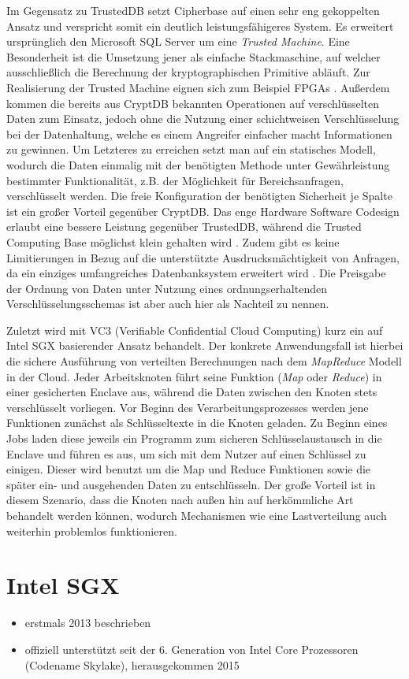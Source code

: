 Im Gegensatz zu TrustedDB setzt Cipherbase \cite{Arasu2012}\cite{Arasu} auf einen sehr eng gekoppelten Ansatz und verspricht somit ein deutlich leistungsfähigeres System. Es erweitert ursprünglich den Microsoft SQL Server um eine \textit{Trusted Machine}. Eine Besonderheit ist die Umsetzung jener als einfache Stackmaschine, auf welcher ausschließlich die Berechnung der kryptographischen Primitive abläuft. Zur Realisierung der Trusted Machine eignen sich zum Beispiel FPGAs \cite{Arasu}. Außerdem kommen die bereits aus CryptDB bekannten Operationen auf verschlüsselten Daten zum Einsatz, jedoch ohne die Nutzung einer schichtweisen Verschlüsselung bei der Datenhaltung, welche es einem Angreifer einfacher macht Informationen zu gewinnen. Um Letzteres zu erreichen setzt man auf ein statisches Modell, wodurch die Daten einmalig mit der benötigten Methode unter Gewährleistung bestimmter Funktionalität, z.B. der Möglichkeit für Bereichsanfragen, verschlüsselt werden. Die freie Konfiguration der benötigten Sicherheit je Spalte ist ein großer Vorteil gegenüber CryptDB. Das enge Hardware Software Codesign erlaubt eine bessere Leistung gegenüber TrustedDB, während die Trusted Computing Base möglichst klein gehalten wird \cite{Arasu}. Zudem gibt es keine Limitierungen in Bezug auf die unterstützte Ausdrucksmächtigkeit von Anfragen, da ein einziges umfangreiches Datenbanksystem erweitert wird \cite{Arasu2013}. Die Preisgabe der Ordnung von Daten unter Nutzung eines ordnungserhaltenden Verschlüsselungsschemas ist aber auch hier als Nachteil zu nennen.

Zuletzt wird mit VC3 (Verifiable Confidential Cloud Computing) \cite{Schuster2015} kurz ein auf Intel SGX basierender Ansatz behandelt. Der konkrete Anwendungsfall ist hierbei die sichere Ausführung von verteilten Berechnungen nach dem \textit{MapReduce} Modell in der Cloud. Jeder Arbeitsknoten führt seine Funktion (\textit{Map} oder \textit{Reduce}) in einer gesicherten Enclave aus, während die Daten zwischen den Knoten stets verschlüsselt vorliegen. Vor Beginn des Verarbeitungsprozesses werden jene Funktionen zunächst als Schlüsseltexte in die Knoten geladen. Zu Beginn eines Jobs laden diese jeweils ein Programm zum sicheren Schlüsselaustausch in die Enclave und führen es aus, um sich mit dem Nutzer auf einen Schlüssel zu einigen. Dieser wird benutzt um die Map und Reduce Funktionen sowie die später ein- und ausgehenden Daten zu entschlüsseln. Der große Vorteil ist in diesem Szenario, dass die Knoten nach außen hin auf herkömmliche Art behandelt werden können, wodurch Mechanismen wie eine Lastverteilung auch weiterhin problemlos funktionieren.

\section{Intel SGX}
\begin{itemize}
	\item erstmals 2013 beschrieben
	\item offiziell unterstützt seit der 6. Generation von Intel Core Prozessoren (Codename Skylake), herausgekommen 2015
\end{itemize}
